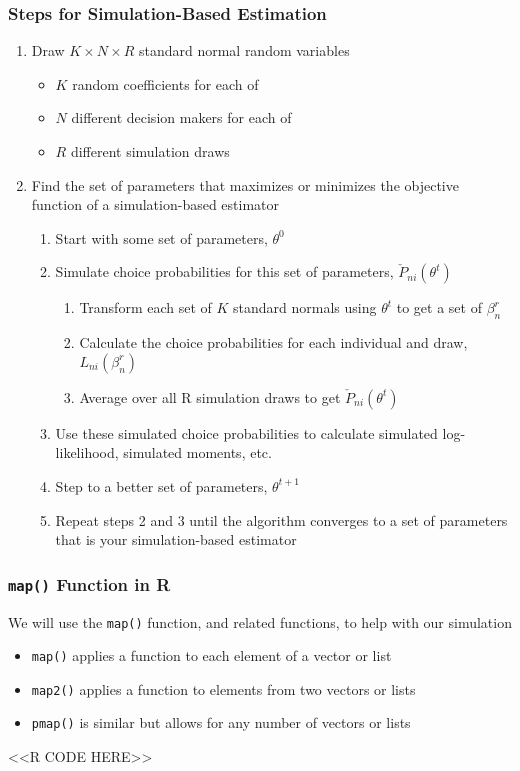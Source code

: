 \documentclass{beamer}
\begin{document}
\begin{frame}\frametitle{Steps for Simulation-Based Estimation}
    \begin{enumerate}
        \item Draw $K \times N \times R$ standard normal random variables
        \begin{itemize}
            \item $K$ random coefficients for each of
            \item $N$ different decision makers for each of
            \item $R$ different simulation draws
        \end{itemize}
        \item Find the set of parameters that maximizes or minimizes the objective function of a simulation-based estimator
        \begin{enumerate}
            \item Start with some set of parameters, $\theta^0$
            \item Simulate choice probabilities for this set of parameters, $\check{P}_{ni}(\theta^t)$
            \begin{enumerate}
                \item Transform each set of $K$ standard normals using $\theta^t$ to get a set of $\beta_n^r$
                \item Calculate the choice probabilities for each individual and draw, $L_{ni}(\beta_n^r)$
                \item Average over all R simulation draws to get $\check{P}_{ni}(\theta^t)$
            \end{enumerate}
            \item Use these simulated choice probabilities to calculate simulated log-likelihood, simulated moments, etc.
            \item Step to a better set of parameters, $\theta^{t + 1}$
            \item Repeat steps 2 and 3 until the algorithm converges to a set of parameters that is your simulation-based estimator
        \end{enumerate}
    \end{enumerate}
\end{frame}

\begin{frame}[fragile]\frametitle{\texttt{map()} Function in R}
    We will use the \texttt{map()} function, and related functions, to help with our simulation
    \begin{itemize}
    	\item \texttt{map()} applies a function to each element of a vector or list
    	\item \texttt{map2()} applies a function to elements from two vectors or lists
    	\item \texttt{pmap()} is similar but allows for any number of vectors or lists
    \end{itemize}
    <<R CODE HERE>>
\end{frame}
\end{document}
